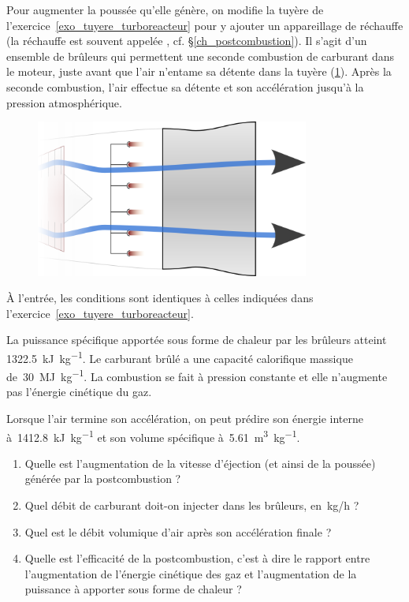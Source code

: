 	Pour augmenter la poussée qu’elle génère, on modifie la tuyère de l’exercice~\ref{exo_tuyere_turboreacteur} pour y ajouter un appareillage de réchauffe (la réchauffe est souvent appelée , cf. \S\ref{ch_postcombustion}). Il s’agit d’un ensemble de brûleurs qui permettent une seconde combustion de carburant dans le moteur, juste avant que l’air n’entame sa détente dans la tuyère (\cref{fig_afterburner}). Après la seconde combustion, l’air effectue sa détente et son accélération jusqu’à la pression atmosphérique.

	\begin{figure}
		\begin{center}
			\includegraphics[width=9cm, max width=0.8\columnwidth]{images/postcombustion.png}
		\end{center}
		\label{fig_afterburner}
	\end{figure}

	À l’entrée, les conditions sont identiques à celles indiquées dans l’exercice~\ref{exo_tuyere_turboreacteur}.
	
	La puissance spécifique apportée sous forme de chaleur par les brûleurs atteint \SI{1322,5}{\kilo\joule\per\kilogram}. Le carburant brûlé a une capacité calorifique massique de~\SI{30}{\mega\joule\per\kilogram}. La combustion se fait à pression constante et elle n’augmente pas l’énergie cinétique du gaz.
	
	Lorsque l’air termine son accélération, on peut prédire son énergie interne à~\SI{1412,8}{\kilo\joule\per\kilogram} et son volume spécifique à~\SI{5,61}{\metre\cubed\per\kilogram}.
	
	\begin{enumerate}
		\item Quelle est l’augmentation de la vitesse d’éjection (et ainsi de la poussée) générée par la postcombustion ?
		\item Quel débit de carburant doit-on injecter dans les brûleurs, en~\si[per-mode=symbol]{\kilogram\per\hour} ?
		\item Quel est le débit volumique d’air après son accélération finale ?
		\item Quelle est l’efficacité de la postcombustion, c’est à dire le rapport entre l’augmentation de l’énergie cinétique des gaz et l’augmentation de la puissance à apporter sous forme de chaleur ?
	\end{enumerate}

